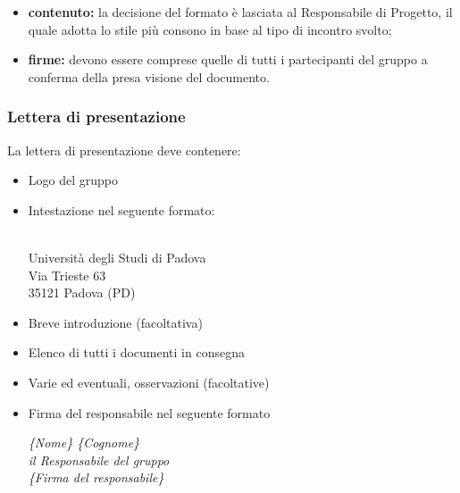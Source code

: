 {{{\begin{itemize}
				\item \textbf{contenuto:} la decisione del formato è lasciata al Responsabile di Progetto, il quale adotta lo stile più consono in base al tipo di incontro svolto;
				\item \textbf{firme:} devono essere comprese quelle di tutti i partecipanti del gruppo \textit{\ggt} a conferma della presa visione del documento. 
			\end{itemize}
		 }
		 \subsubsection{Lettera di presentazione}{
			La lettera di presentazione deve contenere:
			\begin{itemize}
				\item Logo del gruppo
				\item Intestazione nel seguente formato:
				\begin{center}
					\Vardanega \\
					Università degli Studi di Padova\\
					Via Trieste 63\\
					35121 Padova (PD)
				\end{center}
				\item Breve introduzione (facoltativa)
				\item Elenco di tutti i documenti in consegna
				\item Varie ed eventuali, osservazioni (facoltative)
				\item Firma del responsabile nel seguente formato
				\begin{center}
					\textit{\{Nome\} \{Cognome\}}\\
					\textit{il Responsabile del gruppo \ggt}\\
					\textit{\{Firma del responsabile\}}
				\end{center}
			\end{itemize}
		 }
	}

}
